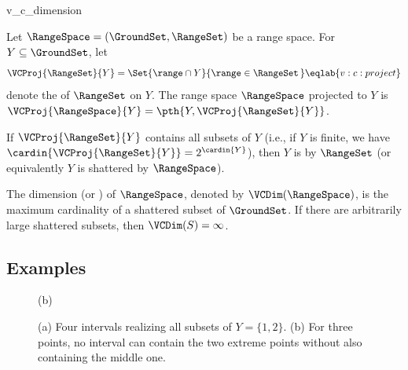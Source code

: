 \begin{fragment}{v_c_dimension}
    \begin{defn}
        Let $\RangeSpace = (\GroundSet,\RangeSet)$ be a range
        space. For $Y \subseteq \GroundSet$, let
        \begin{equation}
            \VCProj{\RangeSet}{Y}%
            =%
            \Set{\range \cap Y}{ \range \in \RangeSet\bigr.\,}
            \eqlab{v:c:project}
        \end{equation}
        denote the  of
        $\RangeSet$ on $Y$. The range space $\RangeSpace$ projected to
        $Y$ is $\VCProj{\RangeSpace}{Y} = \pth{Y,
           \VCProj{\RangeSet}{Y}}$.
        
        If $\VCProj{\RangeSet}{Y}$ contains all subsets of $Y$ (i.e.,
        if $Y$ is finite, we have $\cardin{\VCProj{\RangeSet}{Y}} =
        2^{\cardin{Y}}$), then $Y$ is  by $\RangeSet$
        (or equivalently $Y$ is shattered by $\RangeSpace$).
        
        The  dimension (or
        ) of
        $\RangeSpace$, denoted by $\VCDim(\RangeSpace)$, is the
        maximum cardinality of a shattered subset of $\GroundSet$. If
        there are arbitrarily large shattered subsets, then
        $\VCDim(S) = \infty$.
    \end{defn}
\end{fragment}


\subsection{Examples}




\begin{figure}[t]
    \centering
                   {}{(b)}
    \caption{(a) Four intervals realizing all subsets of $Y = \{1,2\}$.
             (b) For three points, no interval can contain the two extreme points without also containing the middle one.}
\end{figure}

